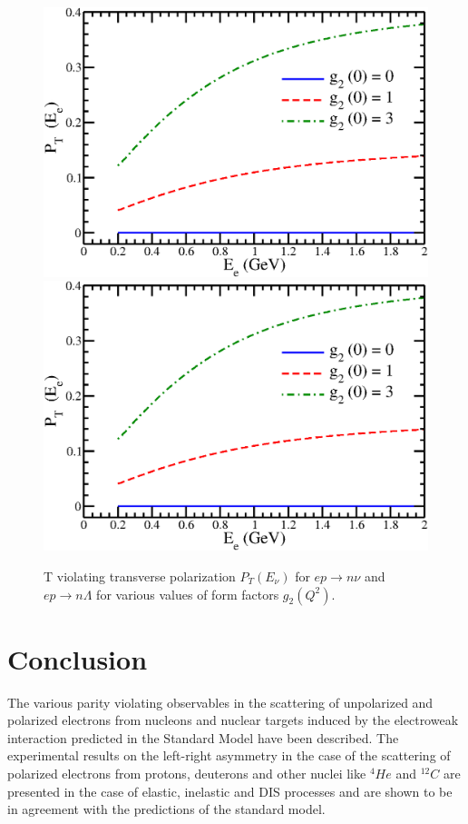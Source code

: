 \begin{figure}[t]
\centering
\includegraphics[scale=0.25]{src/images/chap9/lambda.jpg}
\includegraphics[scale=0.25]{src/images/chap9/lambda.jpg}
\caption{T violating transverse polarization $P_T (E_\nu )$ for $ep  \to  n\nu$ and $ep \to  n \Lambda$ for various values of form factors $g_2 (Q^2)$.}\label{chap9-fig6}
\end{figure}

\section{Conclusion}\label{chap9-sec5}

The various parity violating observables in the scattering of unpolarized and polarized electrons from nucleons and nuclear targets induced  by the electroweak interaction predicted in the Standard Model have been described. The experimental results on the left-right asymmetry in the case of the scattering of polarized electrons from protons, deuterons  and other nuclei like $^4{He}$ and $^{12}{C}$ are presented in the case of elastic, inelastic and DIS processes and are shown to be in agreement with the predictions of the standard model.

